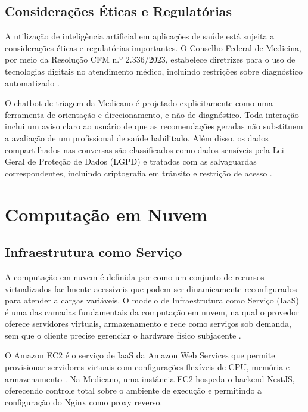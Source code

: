 \subsection{Considerações Éticas e Regulatórias}
\label{subsec:ai-ethics}

A utilização de inteligência artificial em aplicações
de saúde está sujeita a considerações éticas e
regulatórias importantes. O Conselho Federal de Medicina,
por meio da Resolução CFM n.º 2.336/2023, estabelece
diretrizes para o uso de tecnologias digitais no
atendimento médico, incluindo restrições sobre
diagnóstico automatizado \cite{cfm2023}.

O chatbot de triagem da Medicano é projetado
explicitamente como uma ferramenta de orientação e
direcionamento, e não de diagnóstico. Toda interação
inclui um aviso claro ao usuário de que as recomendações
geradas não substituem a avaliação de um profissional
de saúde habilitado. Além disso, os dados compartilhados
nas conversas são classificados como dados sensíveis
pela Lei Geral de Proteção de Dados (LGPD) e tratados
com as salvaguardas correspondentes, incluindo
criptografia em trânsito e restrição de acesso
\cite{cfm2023}.

\section{Computação em Nuvem}
\label{sec:cloud}

\subsection{Infraestrutura como Serviço}
\label{subsec:iaas}

A computação em nuvem é definida por
 como um conjunto de recursos
virtualizados facilmente acessíveis que podem ser
dinamicamente reconfigurados para atender a cargas
variáveis. O modelo de Infraestrutura como Serviço
(IaaS) é uma das camadas fundamentais da computação
em nuvem, na qual o provedor oferece servidores
virtuais, armazenamento e rede como serviços sob
demanda, sem que o cliente precise gerenciar o
hardware físico subjacente \cite{vaquero2009}.

O Amazon EC2 é o serviço de IaaS da Amazon Web Services
que permite provisionar servidores virtuais com
configurações flexíveis de CPU, memória e armazenamento
\cite{awsec2}. Na Medicano, uma instância EC2 hospeda
o backend NestJS, oferecendo controle total sobre o
ambiente de execução e permitindo a configuração do
Nginx como proxy reverso.

